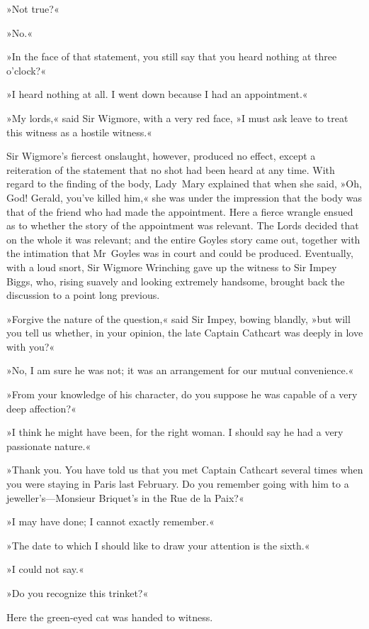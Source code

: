 »Not true?«

»No.«

»In the face of that statement, you still say that you heard nothing at three o'clock?«

»I heard nothing at all. I went down because I had an appointment.«

»My lords,« said Sir Wigmore, with a very red face, »I must ask leave to treat this witness as a hostile witness.«

Sir Wigmore's fiercest onslaught, however, produced no effect, except a reiteration of the statement that no shot had been heard at any time. With regard to the finding of the body, Lady~Mary explained that when she said, »Oh, God! Gerald, you've killed him,« she was under the impression that the body was that of the friend who had made the appointment. Here a fierce wrangle ensued as to whether the story of the appointment was relevant. The Lords decided that on the whole it was relevant; and the entire Goyles story came out, together with the intimation that Mr~Goyles was in court and could be produced.  Eventually, with a loud snort, Sir Wigmore Wrinching gave up the witness to Sir Impey Biggs, who, rising suavely and looking extremely handsome, brought back the discussion to a point long previous.

»Forgive the nature of the question,« said Sir Impey, bowing blandly, »but will you tell us whether, in your opinion, the late Captain Cathcart was deeply in love with you?«

»No, I am sure he was not; it was an arrangement for our mutual convenience.«

»From your knowledge of his character, do you suppose he was capable of a very deep affection?«

»I think he might have been, for the right woman. I should say he had a very passionate nature.«

»Thank you. You have told us that you met Captain Cathcart several times when you were staying in Paris last February. Do you remember going with him to a jeweller's—Monsieur Briquet's in the Rue de la Paix?«

»I may have done; I cannot exactly remember.«

»The date to which I should like to draw your attention is the sixth.«

»I could not say.«

»Do you recognize this trinket?«

Here the green-eyed cat was handed to witness.

